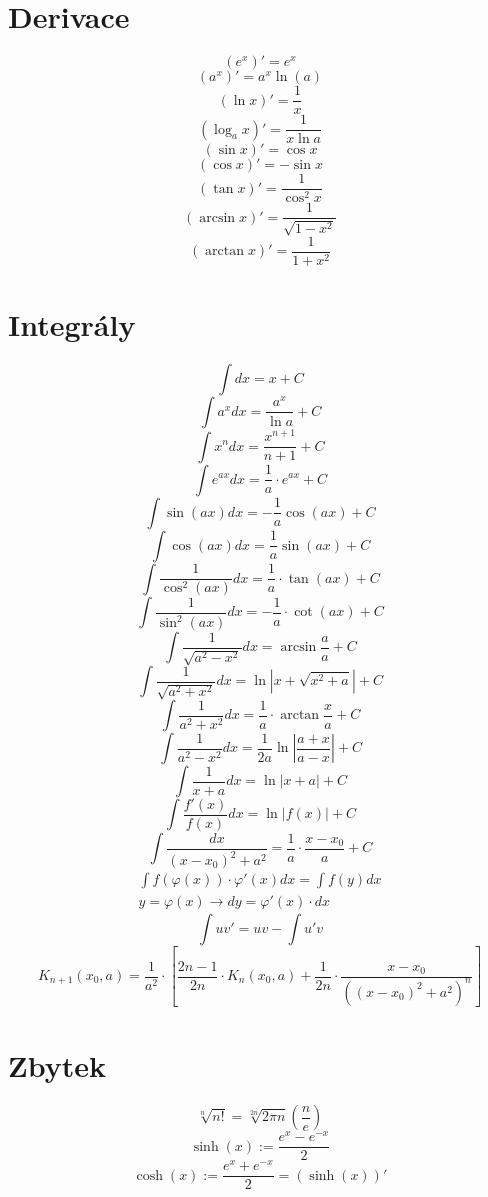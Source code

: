 \documentclass[a4paper]{article}
\begin{document}
\begin{multicols*}{2}
    \section*{Derivace}
        \[ (e^x)' = e^x \]
        \[ (a^x)' = a^x \ln(a) \]
        \[ (\ln x)' = \frac{1}{x} \]
        \[ (\log_a x)' = \frac{1}{x\ln a} \]
        \[ (\sin x)' = \cos x \]
        \[ (\cos x)' = -\sin x \]
        \[ (\tan x)' = \frac{1}{{\cos}^2 x} \]
        \[ (\arcsin x)' = \frac{1}{\sqrt{1-x^2}} \]
        \[ (\arctan x)' = \frac{1}{1+x^2} \]
    \section*{Integrály}
        \[ \int dx = x+C \]
        \[ \int a^x dx = \frac{a^x}{\ln a} + C\]
        \[ \int x^n dx = \frac{x^{n+1}}{n+1} + C\]
        \[ \int e^{ax} dx = \frac{1}{a} \cdot e^{ax} + C \]
        \[ \int \sin(ax) dx = -\frac{1}{a}\cos(ax) + C \]
        \[ \int \cos(ax) dx = \frac{1}{a}\sin(ax) + C \]
        \[ \int \frac{1}{\cos^2(ax)} dx = \frac{1}{a} \cdot \tan(ax) + C \]
        \[ \int \frac{1}{\sin^2(ax)} dx = -\frac{1}{a} \cdot \cot(ax) + C \]
        \[ \int \frac{1}{\sqrt{a^2 - x^2}} dx = \arcsin\frac{a}{a} + C \]
        \[ \int \frac{1}{\sqrt{a^2 + x^2}} dx = \ln \left| x + \sqrt{x^2 + a} \right| + C \]
        \[ \int \frac{1}{a^2 + x^2}dx = \frac{1}{a} \cdot \arctan\frac{x}{a} + C \]
        \[ \int \frac{1}{a^2 - x^2}dx = \frac{1}{2a}\ln\left|\frac{a+x}{a-x}\right| + C \]
        \[ \int \frac{1}{x+a}dx = \ln \left| x+a \right| + C \]
        \[ \int \frac{f'(x)}{f(x)}dx = \ln\left| f(x)\right| + C \]
        \[ \int \frac{dx}{{(x-x_0)}^2 + a^2} = \frac{1}{a} \cdot \frac{x-x_0}{a} + C \]
        \begin{align*}
            { \int f(\varphi(x)) \cdot \varphi'(x)dx = \int f(y)dx }\\
            { y = \varphi(x) \rightarrow dy = \varphi'(x) \cdot dx }
        \end{align*}
         \[ \int uv' = uv - \int u'v \]
        \[ K_{n+1}(x_0, a) = \frac{1}{a^2} \cdot \left[ \frac{2n-1}{2n} \cdot K_n(x_0, a) + \frac{1}{2n} \cdot \frac{x - x_0}{{({(x-x_0)}^2 + a^2)}^n} \right] \]
        \section*{Zbytek}
        \[ \sqrt[n]{n!} = \sqrt[2n]{2\pi n}\left(\frac{n}{e}\right) \]
        \[ \sinh(x):= \frac{e^x - e^{-x}}{2} \]
        \[ \cosh(x) := \frac{e^x + e^{-x}}{2} = (\sinh(x))' \]
\end{multicols*}
\end{document}
